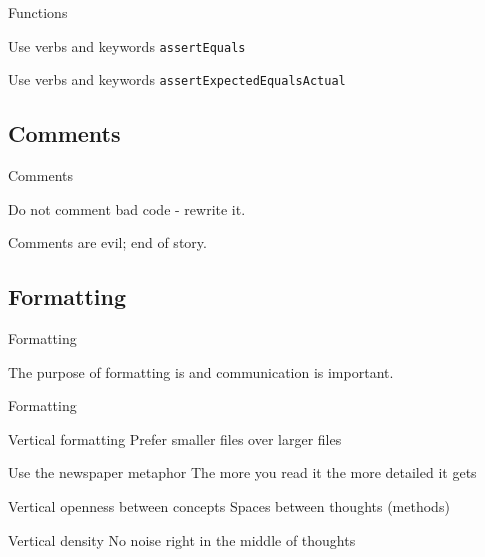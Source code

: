 \begin{frame}[fragile]{Functions}
\begin{alertblock}{Use verbs and keywords}
\lstinline!assertEquals!
\end{alertblock}
\begin{exampleblock}{Use verbs and keywords}
\lstinline!assertExpectedEqualsActual!
\end{exampleblock}
\end{frame}

\subsection{Comments}
\begin{frame}{Comments}
\begin{center}
\alert{Do not comment} bad code - rewrite it.
\end{center}
\begin{center}
Comments are evil; end of story.
\end{center}
\end{frame}

\subsection{Formatting}
\begin{frame}{Formatting}
\begin{center}
The purpose of formatting is  and communication is
important.
\end{center}
\end{frame}

\begin{frame}{Formatting}
\begin{block}{Vertical formatting}
Prefer smaller files over larger files
\end{block}
\begin{block}{Use the newspaper metaphor}
The more you read it the more detailed it gets
\end{block}
\begin{block}{Vertical openness between concepts}
Spaces between thoughts (methods)
\end{block}
\begin{block}{Vertical density}
No noise right in the middle of thoughts
\end{block}
\end{frame}

